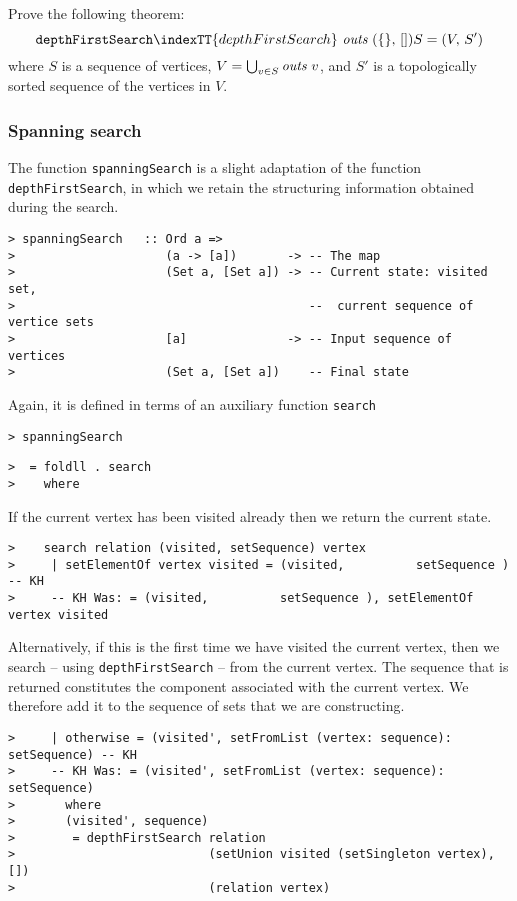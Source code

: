 \begin{exercise}\label{ll:X:scc-depthfirst}
Prove the following theorem:
\[
 \mbox{\tt depthFirstSearch}\indexTT{depthFirstSearch}~ \mbox{\it outs}~ (\{\},\, []) S
  = (V,\, S')
\]
where $S$ is a sequence of vertices, $V = \bigcup_{v\in S} \mbox{\it
outs}~ v$, and $S'$ is a topologically sorted sequence of the vertices
in $V$.
\end{exercise}

\subsubsection{Spanning search}

The function \mbox{\tt spanningSearch} is a slight adaptation of the function
\mbox{\tt depthFirstSearch}, in which we retain the structuring information
obtained during the search.
\begin{verbatim}
> spanningSearch   :: Ord a =>
>                     (a -> [a])       -> -- The map
>                     (Set a, [Set a]) -> -- Current state: visited set,
>                                         --  current sequence of vertice sets
>                     [a]              -> -- Input sequence of vertices
>                     (Set a, [Set a])    -- Final state
\end{verbatim}
%
Again, it is defined in terms of an auxiliary function \mbox{\tt search}
\begin{verbatim}
> spanningSearch
\end{verbatim}
\begin{verbatim}
>  = foldll . search
>    where
\end{verbatim}
If the current vertex has been visited already then we return the
current state.
\begin{verbatim}
>    search relation (visited, setSequence) vertex
>     | setElementOf vertex visited = (visited,          setSequence ) -- KH
>     -- KH Was: = (visited,          setSequence ), setElementOf vertex visited
\end{verbatim}
\par
Alternatively, if this is the first time we have visited the current
vertex, then we search -- using \mbox{\tt depthFirstSearch} -- from the current
vertex.  The sequence that is returned constitutes the component
associated with the current vertex. We therefore add it to the
sequence of sets that we are constructing.
\begin{verbatim}
>     | otherwise = (visited', setFromList (vertex: sequence): setSequence) -- KH
>     -- KH Was: = (visited', setFromList (vertex: sequence): setSequence)
>       where
>       (visited', sequence)
>        = depthFirstSearch relation
>                           (setUnion visited (setSingleton vertex), [])
>                           (relation vertex)
\end{verbatim}
